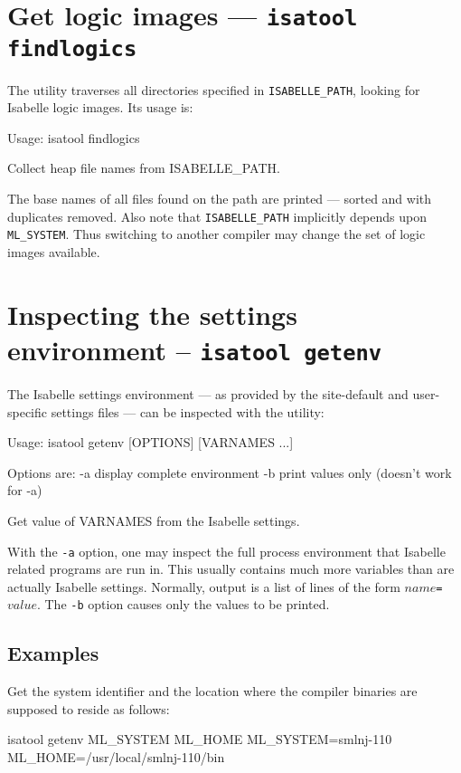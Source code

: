 \section{Get logic images --- \texttt{isatool findlogics}}

The  utility traverses all directories specified in
\texttt{ISABELLE_PATH}, looking for Isabelle logic images. Its usage
is:
\begin{ttbox}
Usage: isatool findlogics

  Collect heap file names from ISABELLE_PATH.
\end{ttbox}
The base names of all files found on the path are printed --- sorted
and with duplicates removed. Also note that \texttt{ISABELLE_PATH}
implicitly depends upon \texttt{ML_SYSTEM}. Thus switching to another
{\ML} compiler may change the set of logic images available.


\section{Inspecting the settings environment -- \texttt{isatool getenv}}
\label{sec:tool-getenv}

The Isabelle settings environment --- as provided by the site-default
and user-specific settings files --- can be inspected with the
 utility:
\begin{ttbox}
Usage: isatool getenv [OPTIONS] [VARNAMES ...]

  Options are:
    -a           display complete environment
    -b           print values only (doesn't work for -a)

  Get value of VARNAMES from the Isabelle settings.
\end{ttbox}

With the \texttt{-a} option, one may inspect the full process
environment that Isabelle related programs are run in. This usually
contains much more variables than are actually Isabelle settings.
Normally, output is a list of lines of the form
\mbox{$name$\texttt{=}$value$}. The \texttt{-b} option causes only the
values to be printed.


\subsection*{Examples}

Get the {\ML} system identifier and the location where the compiler
binaries are supposed to reside as follows:
\begin{ttbox}
isatool getenv ML_SYSTEM ML_HOME
{\out ML_SYSTEM=smlnj-110}
{\out ML_HOME=/usr/local/smlnj-110/bin}
\end{ttbox}

